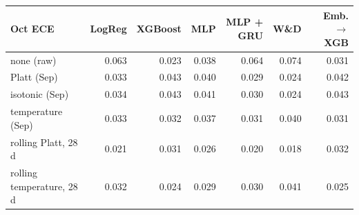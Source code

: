 \begin{tabular}{lrrrrrr}
\toprule
Oct ECE & LogReg & XGBoost & MLP & MLP + GRU & W\&D & Emb.$\rightarrow$XGB \\
\midrule
none (raw) & 0.063 & 0.023 & 0.038 & 0.064 & 0.074 & 0.031 \\
Platt (Sep) & 0.033 & 0.043 & 0.040 & 0.029 & 0.024 & 0.042 \\
isotonic (Sep) & 0.034 & 0.043 & 0.041 & 0.030 & 0.024 & 0.043 \\
temperature (Sep) & 0.033 & 0.032 & 0.037 & 0.031 & 0.040 & 0.031 \\
rolling Platt, 28 d & 0.021 & 0.031 & 0.026 & 0.020 & 0.018 & 0.032 \\
rolling temperature, 28 d & 0.032 & 0.024 & 0.029 & 0.030 & 0.041 & 0.025 \\
\bottomrule
\end{tabular}
